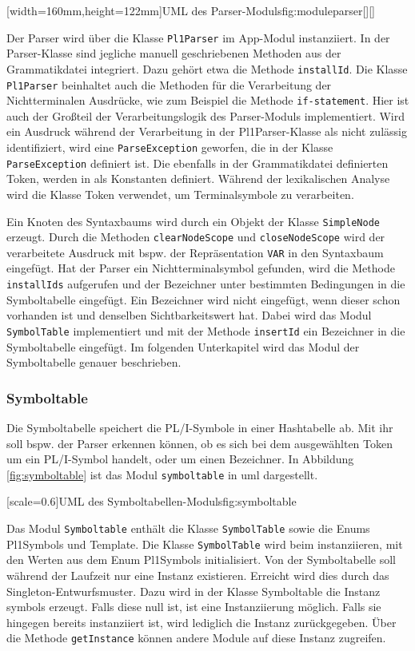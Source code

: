 [width=160mm,height=122mm]{UML des Parser-Moduls}{fig:moduleparser}[][]


Der Parser wird über die Klasse \verb+Pl1Parser+ im App-Modul instanziiert. In der Parser-Klasse sind jegliche manuell geschriebenen Methoden aus der Grammatikdatei integriert. 
Dazu gehört etwa die Methode \verb+installId+. Die Klasse \verb+Pl1Parser+  beinhaltet auch die Methoden für die Verarbeitung der Nichtterminalen Ausdrücke, wie zum Beispiel die Methode \verb+if-statement+. Hier ist auch der Großteil der Verarbeitungslogik des Parser-Moduls implementiert. Wird ein Ausdruck während der Verarbeitung in der Pl1Parser-Klasse als nicht zulässig  identifiziert, wird eine \verb+ParseException+ geworfen, die in der Klasse \verb+ParseException+ definiert ist. Die ebenfalls in der Grammatikdatei definierten Token, werden in  als Konstanten definiert. Während der lexikalischen Analyse wird die Klasse Token verwendet, um Terminalsymbole zu verarbeiten.

Ein Knoten des Syntaxbaums wird durch ein Objekt der Klasse \verb+SimpleNode+ erzeugt. Durch die Methoden \verb+clearNodeScope+ und \verb+closeNodeScope+ wird der verarbeitete Ausdruck mit bspw. der Repräsentation \verb+VAR+ in den Syntaxbaum eingefügt. Hat der Parser ein Nichtterminalsymbol gefunden, wird die Methode \verb+installIds+ aufgerufen und der Bezeichner unter bestimmten Bedingungen in die Symboltabelle eingefügt. Ein Bezeichner wird nicht eingefügt, wenn dieser schon vorhanden ist und denselben Sichtbarkeitswert hat. Dabei wird das Modul \verb+SymbolTable+ implementiert und mit der Methode \verb+insertId+ ein Bezeichner in die Symboltabelle eingefügt. Im folgenden Unterkapitel wird das Modul der Symboltabelle genauer beschrieben. 

\subsubsection{Symboltable}
Die Symboltabelle speichert die PL/I-Symbole in einer Hashtabelle ab. Mit ihr soll bspw. der Parser
erkennen können, ob es sich bei dem ausgewählten Token um ein PL/I-Symbol handelt, oder um einen Bezeichner.
In Abbildung \ref{fig:symboltable} ist das Modul \verb+symboltable+ in \ac{uml} dargestellt.

[scale=0.6]{UML des Symboltabellen-Moduls}{fig:symboltable}

Das Modul \verb+Symboltable+ enthält die Klasse \verb+SymbolTable+ sowie die Enums Pl1Symbols und Template. Die Klasse \verb+SymbolTable+ wird beim instanziieren, mit den Werten aus dem Enum Pl1Symbols initialisiert. Von der Symboltabelle soll während der Laufzeit nur eine Instanz existieren. Erreicht wird dies durch das Singleton-Entwurfsmuster.
Dazu wird in der Klasse Symboltable die Instanz symbols erzeugt. Falls diese null ist, ist eine Instanziierung möglich. Falls sie hingegen bereits instanziiert ist, wird lediglich die Instanz zurückgegeben. Über die Methode \verb+getInstance+ können andere Module auf diese Instanz zugreifen.

